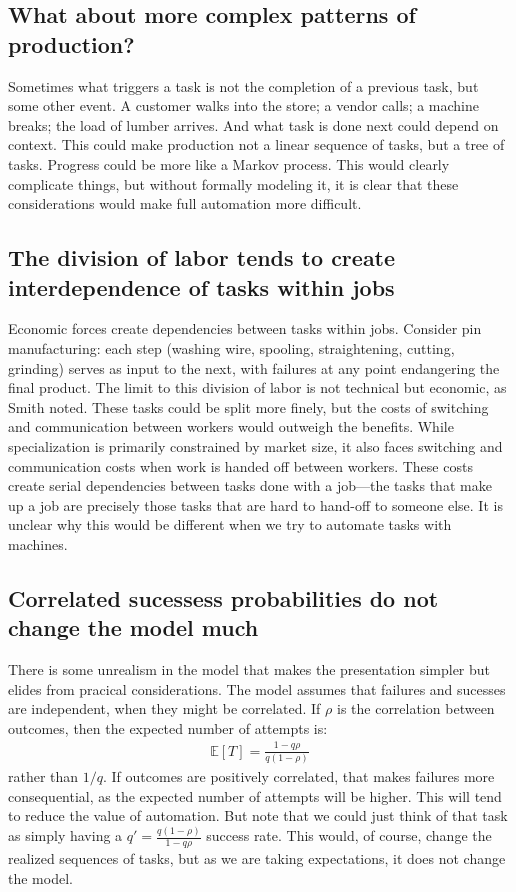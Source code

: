 \documentclass{article}
\theoremstyle{plain}
\theoremstyle{plain}
\begin{document}
\subsection{What about more complex patterns of production?}
Sometimes what triggers a task is not the completion of a previous task, but some other event. 
A customer walks into the store; a vendor calls; a machine breaks; the load of lumber arrives.
And what task is done next could depend on context. 
This could make production not a linear sequence of tasks, but a tree of tasks. 
Progress could be more like a Markov process. 
This would clearly complicate things, but without formally modeling it, it is clear that these considerations would make full automation more difficult.

\subsection{The division of labor tends to create interdependence of tasks within jobs}
Economic forces create dependencies between tasks within jobs. 
Consider pin manufacturing: each step (washing wire, spooling, straightening, cutting, grinding) serves as input to the next, with failures at any point endangering the final product. 
The limit to this division of labor is not technical but economic, as Smith noted.
These tasks could be split more finely, but the costs of switching and communication between workers would outweigh the benefits.
While specialization is primarily constrained by market size, it also faces switching and communication costs when work is handed off between workers. 
These costs create serial dependencies between tasks done with a job---the tasks that make up a job are precisely those tasks that are hard to hand-off to someone else. 
It is unclear why this would be different when we try to automate tasks with machines.


\subsection{Correlated sucessess probabilities do not change the model much} \label{sec:correlated_successes}
There is some unrealism in the model that makes the presentation simpler but elides from pracical considerations.
The model assumes that failures and sucesses are independent, when they might be correlated.
If $\rho$ is the correlation between outcomes, then the expected number of attempts is:
\begin{align}
\mathbb{E}[T] = \frac{1 - q\rho}{q(1 - \rho)} 
\end{align}
rather than $1/q$.
If outcomes are positively correlated, that makes failures more consequential, as the expected number of attempts will be higher. 
This will tend to reduce the value of automation.
But note that we could just think of that task as simply having a $q' = \frac{q(1 - \rho)}{1 - q\rho}$ success rate.
This would, of course, change the realized sequences of tasks, but as we are taking expectations, it does not change the model.
\end{document}
